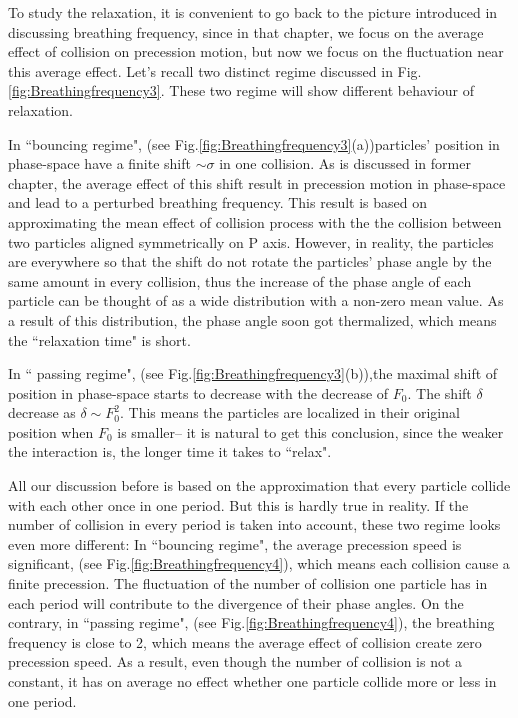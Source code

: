 \documentclass[aps,pre,twocolumn,groupedaddress]{revtex4-1}
\begin{document}
To study the relaxation, it is convenient to go back to the picture introduced in discussing breathing frequency, since in that chapter, we focus on the average effect of collision on precession motion, but now we focus on the fluctuation near this average effect. Let's recall two distinct regime discussed in Fig.\ref{fig:Breathingfrequency3}. These two regime will show different behaviour of relaxation.

In ``bouncing regime", (see Fig.\ref{fig:Breathingfrequency3}(a))particles' position in phase-space have a finite shift $\sim\sigma$ in one collision. As is discussed in former chapter, the average effect of this shift result in precession motion in phase-space and lead to a perturbed breathing frequency. This result is based on approximating the mean effect of collision process with the the collision between two particles aligned symmetrically on P axis. However, in reality, the particles 
are everywhere so that the shift do not rotate the particles' phase angle by the same amount in every collision, thus the increase of the phase angle of each particle can be thought of as a wide distribution with a non-zero mean value. As a result of this distribution, the phase angle soon got thermalized, which means the ``relaxation time" is short.

In `` passing regime", (see Fig.\ref{fig:Breathingfrequency3}(b)),the maximal shift of position in phase-space starts to decrease with the decrease of $F_0$. The shift $\delta$ decrease as $\delta\sim F_0^2$. This means the particles are localized in their original position when $F_0$ is smaller-- it is natural to get this conclusion, since the weaker the interaction is, the longer time it takes to ``relax".

All our discussion before is based on the approximation that every particle collide with each other once in one period. But this is hardly true in reality. If the number of collision in every period is taken into account, these two regime looks even more different: In ``bouncing regime", the average precession speed is significant, (see Fig.\ref{fig:Breathingfrequency4}), which means each collision cause a finite precession. The fluctuation of the number of collision one particle has in each period will contribute to the divergence of their phase angles. On the contrary, in ``passing regime", (see Fig.\ref{fig:Breathingfrequency4}), the breathing frequency is close to 2, which means the average effect of collision create zero precession speed. As a result, even though the number of collision is not a constant, it has on average no effect whether one particle collide more or less in one period. 
\end{document}
